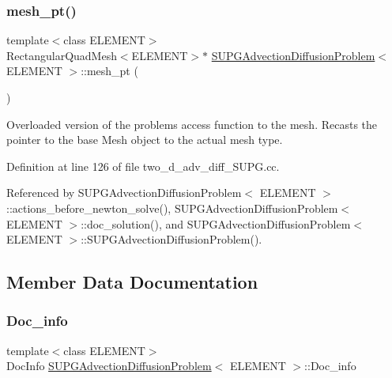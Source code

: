 \subsubsection{\texorpdfstring{mesh\+\_\+pt()}{mesh\_pt()}}
{\footnotesize\ttfamily template$<$class E\+L\+E\+M\+E\+NT$>$ \\
Rectangular\+Quad\+Mesh$<$E\+L\+E\+M\+E\+NT$>$$\ast$ \hyperlink{classSUPGAdvectionDiffusionProblem}{S\+U\+P\+G\+Advection\+Diffusion\+Problem}$<$ E\+L\+E\+M\+E\+NT $>$\+::mesh\+\_\+pt (\begin{DoxyParamCaption}{ }\end{DoxyParamCaption})\hspace{0.3cm}{\ttfamily [inline]}}



Overloaded version of the problem\textquotesingle{}s access function to the mesh. Recasts the pointer to the base Mesh object to the actual mesh type. 



Definition at line 126 of file two\+\_\+d\+\_\+adv\+\_\+diff\+\_\+\+S\+U\+P\+G.\+cc.



Referenced by S\+U\+P\+G\+Advection\+Diffusion\+Problem$<$ E\+L\+E\+M\+E\+N\+T $>$\+::actions\+\_\+before\+\_\+newton\+\_\+solve(), S\+U\+P\+G\+Advection\+Diffusion\+Problem$<$ E\+L\+E\+M\+E\+N\+T $>$\+::doc\+\_\+solution(), and S\+U\+P\+G\+Advection\+Diffusion\+Problem$<$ E\+L\+E\+M\+E\+N\+T $>$\+::\+S\+U\+P\+G\+Advection\+Diffusion\+Problem().



\subsection{Member Data Documentation}
\mbox{\label{classSUPGAdvectionDiffusionProblem_af80606875e03033c0de217f7a861d0af}} 
\subsubsection{\texorpdfstring{Doc\+\_\+info}{Doc\_info}}
{\footnotesize\ttfamily template$<$class E\+L\+E\+M\+E\+NT$>$ \\
Doc\+Info \hyperlink{classSUPGAdvectionDiffusionProblem}{S\+U\+P\+G\+Advection\+Diffusion\+Problem}$<$ E\+L\+E\+M\+E\+NT $>$\+::Doc\+\_\+info\hspace{0.3cm}{\ttfamily [private]}}



